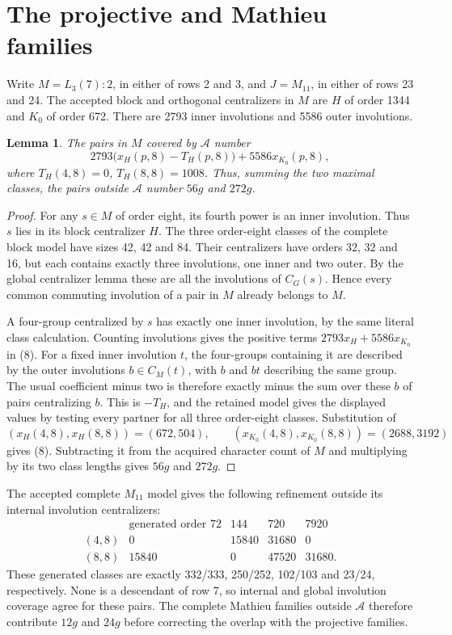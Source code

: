 \documentclass[11pt,a4paper]{article}
\newtheorem{lemma}{Lemma}\newtheorem{theorem}{Theorem}
\begin{document}
\section*{The projective and Mathieu families}
Write $M=L_3(7):2$, in either of rows 2 and 3, and $J=M_{11}$,
in either of rows 23 and 24. The accepted block and orthogonal
centralizers in $M$ are $H$ of order 1344 and $K_0$ of order 672.
There are 2793 inner involutions and 5586 outer involutions.

\begin{lemma}\label{Mcover}
The pairs in $M$ covered by $\mathcal A$ number
\[
 2793\bigl(x_H(p,8)-T_H(p,8)\bigr)+5586x_{K_0}(p,8),        \tag{8}
\]
where $T_H(4,8)=0$, $T_H(8,8)=1008$. Thus, summing the two maximal
classes, the pairs outside $\mathcal A$ number $56g$ and $272g$.
\end{lemma}
\begin{proof}
For any $s\in M$ of order eight, its fourth power is an inner
involution. Thus $s$ lies in its block centralizer $H$.
The three order-eight classes of the complete block model have
sizes 42, 42 and 84. Their centralizers have orders 32, 32 and 16,
but each contains exactly three involutions, one inner and two outer.
By the global centralizer lemma these are all the involutions of
$C_G(s)$. Hence every common commuting involution of a pair in $M$
already belongs to $M$.

A four-group centralized by $s$ has exactly one inner involution,
by the same literal class calculation. Counting involutions gives
the positive terms $2793x_H+5586x_{K_0}$ in (8). For a fixed inner
involution $t$, the four-groups containing it are described by the
outer involutions $b\in C_M(t)$, with $b$ and $bt$ describing the
same group. The usual coefficient minus two is therefore exactly
minus the sum over these $b$ of pairs centralizing $b$. This is
$-T_H$, and the retained model gives the displayed values by testing
every partner for all three order-eight classes. Substitution of
\[
 (x_H(4,8),x_H(8,8))=(672,504),\qquad
 (x_{K_0}(4,8),x_{K_0}(8,8))=(2688,3192)
\]
gives (8). Subtracting it from the acquired character count of $M$
and multiplying by its two class lengths gives $56g$ and $272g$.
\end{proof}

The accepted complete $M_{11}$ model gives the following refinement
outside its internal involution centralizers:
\[
\begin{array}{c|rrrr}
 &\text{generated order }72&144&720&7920\\\hline
(4,8)&0&15840&31680&0\\
(8,8)&15840&0&47520&31680.
\end{array}                                                \tag{9}
\]
These generated classes are exactly 332/333, 250/252, 102/103 and
23/24, respectively. None is a descendant of row 7, so internal
and global involution coverage agree for these pairs. The complete
Mathieu families outside $\mathcal A$ therefore contribute $12g$
and $24g$ before correcting the overlap with the projective families.
\end{document}
